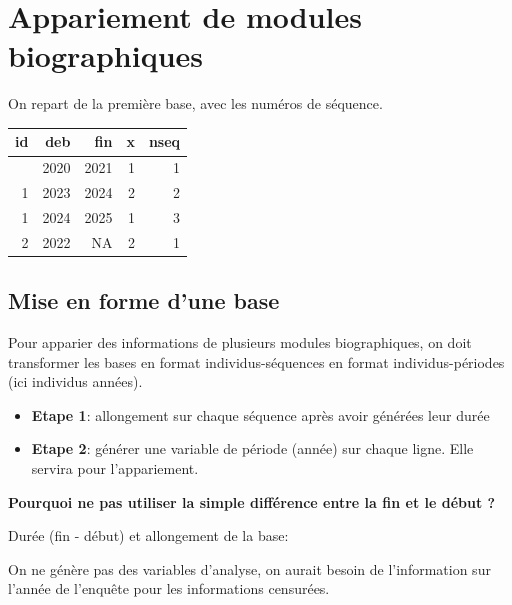 \documentclass[
  12pt,
  letterpaper,
  DIV=11,
  numbers=noendperiod,
  onepage,
  openany]{scrreprt}
\newenvironment{Shaded}{\begin{snugshade}}{\end{snugshade}}
\newcommand{\DecValTok}[1]{\textcolor[rgb]{0.86,0.86,0.80}{#1}}
\newcommand{\FunctionTok}[1]{\textcolor[rgb]{0.94,0.94,0.56}{#1}}
\newcommand{\NormalTok}[1]{\textcolor[rgb]{0.80,0.80,0.80}{#1}}
\newcommand{\OtherTok}[1]{\textcolor[rgb]{0.94,0.94,0.56}{#1}}
\newcommand{\SpecialCharTok}[1]{\textcolor[rgb]{0.86,0.64,0.64}{#1}}
\providecommand{\tightlist}{%
  \setlength{\itemsep}{0pt}\setlength{\parskip}{0pt}}\usepackage{longtable,booktabs,array}
\begin{document}
\hypertarget{appariement-de-modules-biographiques}{%
\section{Appariement de modules
biographiques}\label{appariement-de-modules-biographiques}}

On repart de la première base, avec les numéros de séquence.

\begin{longtable}[]{@{}rrrrr@{}}
\toprule\noalign{}
id & deb & fin & x & nseq \\
\midrule\noalign{}
\endhead
\bottomrule\noalign{}
\endlastfoot
1 & 2020 & 2021 & 1 & 1 \\
1 & 2023 & 2024 & 2 & 2 \\
1 & 2024 & 2025 & 1 & 3 \\
2 & 2022 & NA & 2 & 1 \\
\end{longtable}

\hypertarget{mise-en-forme-dune-base}{%
\subsection{Mise en forme d'une base}\label{mise-en-forme-dune-base}}

Pour apparier des informations de plusieurs modules biographiques, on
doit transformer les bases en format individus-séquences en format
individus-périodes (ici individus années).

\begin{itemize}
\tightlist
\item
  \textbf{Etape 1}: allongement sur chaque séquence après avoir générées
  leur durée
\item
  \textbf{Etape 2}: générer une variable de période (année) sur chaque
  ligne. Elle servira pour l'appariement.
\end{itemize}

\textbf{Pourquoi ne pas utiliser la simple différence entre la fin et le
début ?}

Durée (fin - début) et allongement de la base:

On ne génère pas des variables d'analyse, on aurait besoin de
l'information sur l'année de l'enquête pour les informations censurées.

\begin{Shaded}
\end{Shaded}
\end{document}
